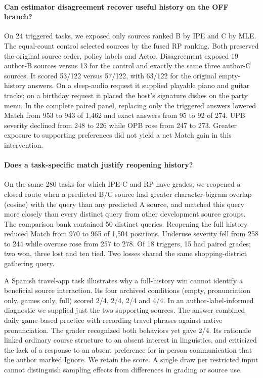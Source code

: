 \documentclass[11pt]{article}
\begin{document}
\paragraph{Can estimator disagreement recover useful history on the OFF branch?}
On 24 triggered tasks, we exposed only sources ranked B by IPE and C by MLE. The equal-count control selected sources by the fused RP ranking. Both preserved the original source order, policy labels and Actor. Disagreement exposed 19 author-B sources versus 13 for the control and exactly the same three author-C sources. It scored 53/122 versus 57/122, with 63/122 for the original empty-history answers. On a sleep-audio request it supplied playable piano and guitar tracks; on a birthday request it placed the host's signature dishes on the party menu. In the complete paired panel, replacing only the triggered answers lowered Match from 953 to 943 of 1,462 and exact answers from 95 to 92 of 274. UPB severity declined from 248 to 226 while OPB rose from 247 to 273. Greater exposure to supporting preferences did not yield a net Match gain in this intervention.

\paragraph{Does a task-specific match justify reopening history?}
On the same 280 tasks for which IPE-C and RP have grades, we reopened a closed route when a predicted B/C source had greater character-bigram overlap (cosine) with the query than any predicted A source, and matched this query more closely than every distinct query from other development source groups. The comparison bank contained 50 distinct queries. Reopening the full history reduced Match from 970 to 965 of 1,504 positions. Underuse severity fell from 258 to 244 while overuse rose from 257 to 278. Of 18 triggers, 15 had paired grades; two won, three lost and ten tied. Two losses shared the same shopping-district gathering query.

A Spanish travel-app task illustrates why a full-history win cannot identify a beneficial source interaction. Its four archived conditions (empty, pronunciation only, games only, full) scored 2/4, 2/4, 2/4 and 4/4. In an author-label-informed diagnostic we supplied just the two supporting sources. The answer combined daily game-based practice with recording travel phrases against native pronunciation. The grader recognized both behaviors yet gave 2/4. Its rationale linked ordinary course structure to an absent interest in linguistics, and criticized the lack of a response to an absent preference for in-person communication that the author marked Ignore. We retain the score. A single draw per restricted input cannot distinguish sampling effects from differences in grading or source use.
\end{document}

